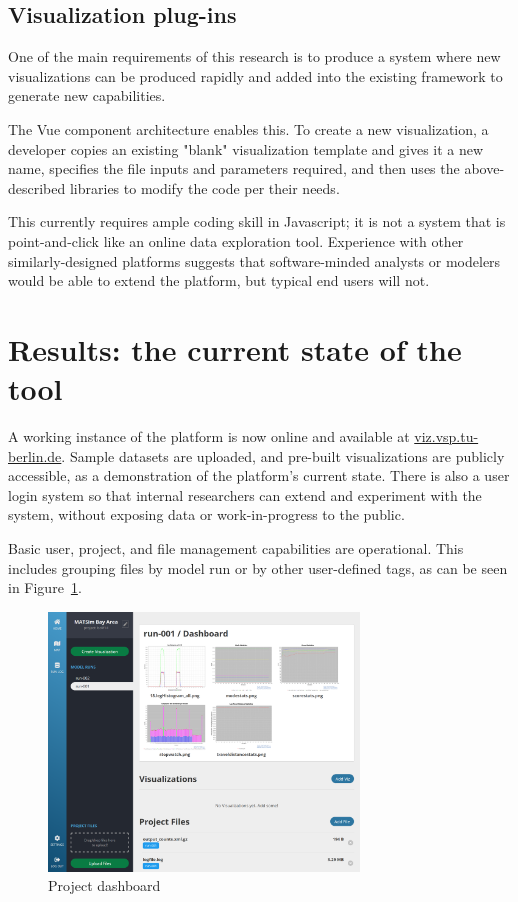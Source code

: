 \documentclass[Afour,sagev,times]{sagej}
\begin{document}
\subsection{Visualization plug-ins}

One of the main requirements of this research is to produce a system where new visualizations can be produced rapidly and added into the existing framework to generate new capabilities.

The Vue component architecture enables this. To create a new visualization, a developer copies an existing "blank" visualization template and gives it a new name, specifies the file inputs and parameters required, and then uses the above-described libraries to modify the code per their needs.

This currently requires ample coding skill in Javascript; it is not a system that is point-and-click like an online data exploration tool. Experience with other similarly-designed platforms suggests that software-minded analysts or modelers would be able to extend the platform, but typical end users will not.

\section{Results: the current state of the tool}

A working instance of the platform is now online and available at \url{viz.vsp.tu-berlin.de}. Sample datasets are uploaded, and pre-built visualizations are publicly accessible, as a demonstration of the platform's current state. There is also a user login system so that internal researchers can extend and experiment with the system, without exposing data or work-in-progress to the public.

Basic user, project, and file management capabilities are operational. This includes grouping files by model run or by other user-defined tags, as can be seen in Figure~\ref{F1}.

\begin{figure}
\centering
\includegraphics[width=3.25in]{fig-dashboard.png}
\caption{Project dashboard}\label{F1}
\end{figure}
\end{document}
